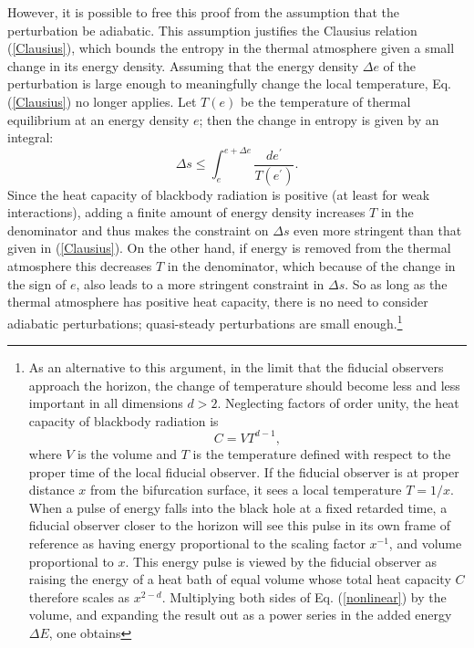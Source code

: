 \documentclass[12pt]{article}
\begin{document}
However, it is possible to free this proof from the assumption that the perturbation be adiabatic.  This assumption justifies the Clausius relation (\ref{Clausius}), which bounds the entropy in the thermal atmosphere given a small change in its energy density.  Assuming that the energy density $\Delta e$ of the perturbation is large enough to meaningfully change the local temperature, Eq. (\ref{Clausius}) no longer applies.  Let $T(e)$ be the temperature of thermal equilibrium at an energy density $e$; then the change in entropy is given by an integral:
\begin{equation}\label{nonlinear}
\Delta s \le \int^{e + \Delta e}_e \!\frac{de^\prime}{T(e^{\prime})}.
\end{equation}
Since the heat capacity of blackbody radiation is positive (at least for weak interactions), adding a finite amount of energy density increases $T$ in the denominator and thus makes the constraint on $\Delta s$ even more stringent than that given in (\ref{Clausius}).  On the other hand, if energy is removed from the thermal atmosphere this decreases $T$ in the denominator, which because of the change in the sign of $e$, also leads to a more stringent constraint in $\Delta s$.  So as long as the thermal atmosphere has positive heat capacity, there is no need to consider adiabatic perturbations; quasi-steady perturbations are small enough.\footnote{As an alternative to this argument, in the limit that the fiducial observers approach the horizon, the change of temperature should become less and less important in all dimensions $d > 2$.  Neglecting factors of order unity, the heat capacity of blackbody radiation is \begin{equation}\label{cap}
C = VT^{d - 1},
\end{equation}
where $V$ is the volume and $T$ is the temperature defined with respect to the proper time of the local fiducial observer.  If the fiducial observer is at proper distance $x$ from the bifurcation surface, it sees a local temperature $T = 1/x$.  When a pulse of energy falls into the black hole at a fixed retarded time, a fiducial observer closer to the horizon will see this pulse in its own frame of reference as having energy proportional to the scaling factor $x^{-1}$, and volume proportional to $x$.  This energy pulse is viewed by the fiducial observer as raising the energy of a heat bath of equal volume whose total heat capacity $C$ therefore scales as $x^{2 - d}$.  Multiplying both sides of Eq. (\ref{nonlinear}) by the volume, and expanding the result out as a power series in the added energy $\Delta E$, one obtains
}
\end{document}
